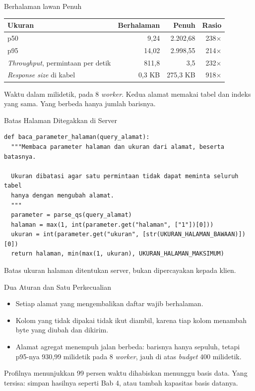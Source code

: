 \documentclass[aspectratio=169, table, 12pt]{beamer}
\begin{document}
\begin{frame}{{\Large Berhalaman lawan Penuh}}
  \vspace{6pt}
  \centering
  {\footnotesize
  \begin{tabularx}{\textwidth}{Yrrr}
    \hline
    \textbf{Ukuran} & \textbf{Berhalaman} & \textbf{Penuh} & \textbf{Rasio} \\
    \hline
    p50 & 9,24 & 2.202,68 & 238$\times$ \\
    \hline
    p95 & 14,02 & 2.998,55 & 214$\times$ \\
    \hline
    \textit{Throughput}, permintaan per detik & 811,8 & 3,5 & 232$\times$ \\
    \hline
    \textit{Response size} di kabel & 0,3 KB & 275,3 KB & 918$\times$ \\
    \hline
  \end{tabularx}}

  \vspace{8pt}
  {\footnotesize Waktu dalam milidetik, pada 8 \textit{worker}. Kedua alamat
  memakai tabel dan indeks yang sama. Yang berbeda hanya jumlah barisnya.}
\end{frame}

\begin{frame}[fragile]{{\Large Batas Halaman Ditegakkan di Server}}
  \vspace{2pt}
\begin{lstlisting}[style=PythonStyle]
def baca_parameter_halaman(query_alamat):
  """Membaca parameter halaman dan ukuran dari alamat, beserta batasnya.

  Ukuran dibatasi agar satu permintaan tidak dapat meminta seluruh tabel
  hanya dengan mengubah alamat.
  """
  parameter = parse_qs(query_alamat)
  halaman = max(1, int(parameter.get("halaman", ["1"])[0]))
  ukuran = int(parameter.get("ukuran", [str(UKURAN_HALAMAN_BAWAAN)])[0])
  return halaman, min(max(1, ukuran), UKURAN_HALAMAN_MAKSIMUM)
\end{lstlisting}
  \vspace{2pt}
  {\footnotesize Batas ukuran halaman ditentukan server, bukan dipercayakan
  kepada klien.}
\end{frame}

\begin{frame}{{\Large Dua Aturan dan Satu Perkecualian}}
  \vspace{12pt}
  \begin{itemize}
    \item Setiap alamat yang mengembalikan daftar wajib berhalaman.
    \item Kolom yang tidak dipakai tidak ikut diambil, karena tiap kolom
          menambah byte yang diubah dan dikirim.
    \item Alamat agregat menempuh jalan berbeda: barisnya hanya sepuluh,
          tetapi p95-nya 930,99 milidetik pada 8 \textit{worker}, jauh di
          atas \textit{budget} 400 milidetik.
  \end{itemize}
  \vspace{8pt}
  {\footnotesize Profilnya menunjukkan 99 persen waktu dihabiskan menunggu
  basis data. Yang tersisa: simpan hasilnya seperti Bab 4, atau tambah
  kapasitas basis datanya.}
\end{frame}
\end{document}
